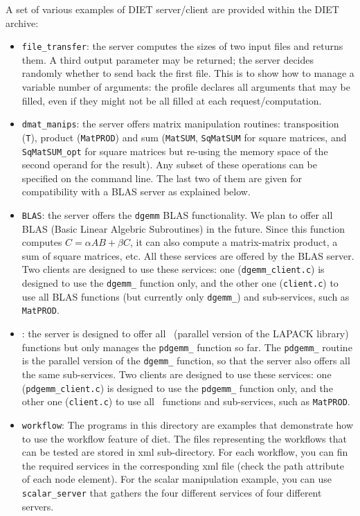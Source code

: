 A set of various examples of DIET server/client are provided within
the DIET archive:
\begin{itemize}
\item{\texttt{file\_transfer}}: the server computes the sizes of two
  input files and returns them. A third output parameter may be
  returned; the server decides randomly whether to send back the
  first file. This is to show how to manage a variable number of
  arguments: the profile declares all arguments that may be filled,
  even if they might not be all filled at each request/computation.

\item{\texttt{dmat\_manips}}: the server offers matrix manipulation
  routines: transposition (\texttt{T}), product (\texttt{MatPROD}) and
  sum (\texttt{MatSUM}, \texttt{SqMatSUM} for square matrices, and
  \texttt{SqMatSUM\_opt} for square matrices but re-using the memory
  space of the second operand for the result). Any subset of these
  operations can be specified on the command line. The last two of
  them are given for compatibility with a BLAS server as explained below.
  
\item{\texttt{BLAS}}: the server offers the \texttt{dgemm} BLAS
  functionality.  We plan to offer all BLAS (Basic Linear Algebric
  Subroutines) in the future. Since this function computes
  $C = \alpha AB + \beta C$, it can also compute a matrix-matrix
  product, a sum of square matrices, etc. All these services are
  offered by the BLAS server. Two clients are designed to use these
  services: one (\texttt{dgemm\_client.c}) is designed to use the
  \texttt{dgemm\_} function only, and the other one
  (\texttt{client.c}) to use all BLAS functions (but currently only
  \texttt{dgemm\_}) and sub-services, such as \texttt{MatPROD}.
  
\item{\texttt{\scalapack}}: the server is designed to offer all
  \scalapack\  (parallel version of the LAPACK library) functions but
  only manages the \texttt{pdgemm\_} function so far. The
  \texttt{pdgemm\_} routine is the parallel version of the
  \texttt{dgemm\_} function, so that the server also offers all the
  same sub-services. Two clients are designed to use these services:
  one (\texttt{pdgemm\_client.c}) is designed to use the
  \texttt{pdgemm\_} function only, and the other one
  (\texttt{client.c}) to use all \scalapack\ functions and
  sub-services, such as \texttt{MatPROD}.

\item{\texttt{workflow}}: The programs in this directory are examples that
  demonstrate how to use the workflow feature of diet.
  The files representing the workflows that can be tested are stored in
  xml sub-directory.
  For each workflow, you can fin the required services in the corresponding
  xml file (check the path attribute of each node element).
  For the scalar manipulation example, you can use \texttt{scalar\_server}
  that gathers the four different services of four different servers.
\end{itemize}

